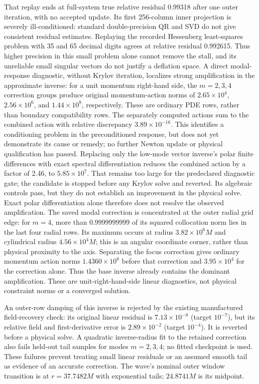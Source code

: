 \documentclass[aps,prd,preprint,notitlepage,nofootinbib]{revtex4-2}
\begin{document}
That replay ends at full-system true relative residual 0.99318 after one
outer iteration, with no accepted update. Its first 256-column inner
projection is severely ill-conditioned: standard double-precision QR
and SVD do not give consistent residual estimates. Replaying the recorded
Hessenberg least-squares problem with 35 and 65 decimal digits agrees at
relative residual 0.992615. Thus higher precision in this small problem
alone cannot remove the stall, and its unreliable small singular vectors
do not justify a deflation space. A direct modal-response diagnostic,
without Krylov iteration, localizes strong amplification in the approximate
inverse: for a unit momentum right-hand side, the $m=2,3,4$ correction
groups produce original momentum-action norms of $2.65\times10^4$,
$2.56\times10^6$, and $1.44\times10^8$, respectively. These are ordinary
PDE rows, rather than boundary compatibility rows. The separately computed
actions sum to the combined action with relative discrepancy
$3.89\times10^{-16}$. This identifies a conditioning problem in the
preconditioned response, but does not yet demonstrate its cause or remedy;
no further Newton update or physical qualification has passed.
Replacing only the low-mode vector inverse's polar finite differences
with exact spectral differentiation reduces the combined action by a
factor of 2.46, to $5.85\times10^7$. That remains too large for the
predeclared diagnostic gate; the candidate is stopped before any Krylov
solve and reverted. Its algebraic controls pass, but they do not establish
an improvement in the physical solve. Exact polar differentiation alone
therefore does not resolve the observed amplification.
The saved modal correction is concentrated at the outer radial grid edge:
for $m=4$, more than $0.9999999999$ of its squared collocation norm lies
in the last four radial rows. Its maximum occurs at radius
$3.82\times10^6M$ and cylindrical radius $4.56\times10^4M$;
this is an angular coordinate corner, rather than physical proximity to
the axis. Separating the focus correction gives ordinary momentum action
norms $1.4360\times10^8$ before that correction and
$3.95\times10^4$ for the correction alone. Thus the base inverse already
contains the dominant amplification. These are unit-right-hand-side
linear diagnostics, not physical constraint norms or a converged solution.

An outer-row damping of this inverse is rejected by the existing
manufactured field-recovery check: its original linear residual is
$7.13\times10^{-8}$ (target $10^{-7}$), but its relative field and
first-derivative error is $2.89\times10^{-2}$ (target $10^{-4}$).
It is reverted before a physical solve. A quadratic inverse-radius fit to
the retained correction also fails held-out tail samples for modes
$m=2,3,4$; no fitted checkpoint is used. These failures prevent treating
small linear residuals or an assumed smooth tail as evidence of an
accurate correction. The wave's nominal outer window transition is at
$r=37.7482M$ with exponential tails; $24.8741M$ is its midpoint.
\end{document}
